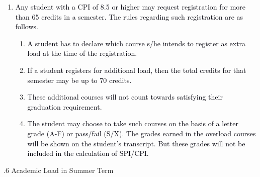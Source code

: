 \documentclass[12pt]{article}
\begin{document}
\vspace{\baselineskip}
\begin{enumerate}
	\item {\fontsize{10pt}{12.0pt}\selectfont \textcolor[HTML]{00000A}{Any student with a CPI of 8.5 or higher may request registration for more than 65 credits in a semester. The rules regarding such registration are as follows.}\par}\par


\vspace{\baselineskip}
\begin{enumerate}
	\item {\fontsize{10pt}{12.0pt}\selectfont \textcolor[HTML]{00000A}{A student has to declare which course s/he intends to register as extra load at the time of the registration.}\par}\par


\vspace{\baselineskip}
	\item {\fontsize{10pt}{12.0pt}\selectfont \textcolor[HTML]{00000A}{If a student registers for additional load, then the total credits for that semester may be up to 70 credits.}\par}\par


\vspace{\baselineskip}
	\item {\fontsize{10pt}{12.0pt}\selectfont \textcolor[HTML]{00000A}{These additional courses will not count towards satisfying their graduation requirement.}\par}\par


\vspace{\baselineskip}
	\item {\fontsize{10pt}{12.0pt}\selectfont \textcolor[HTML]{00000A}{The student may choose to take such courses on the basis of a letter grade (A-F) or pass/fail (S/X). The grades earned in the overload courses will be shown on the student's transcript. But these grades will not be included in the calculation of SPI/CPI.}\par}
\end{enumerate}
\end{enumerate}\par


\vspace{\baselineskip}

\vspace{\baselineskip}
{\fontsize{10pt}{12.0pt}.6 Academic Load in Summer Term\par}\par
\end{document}
